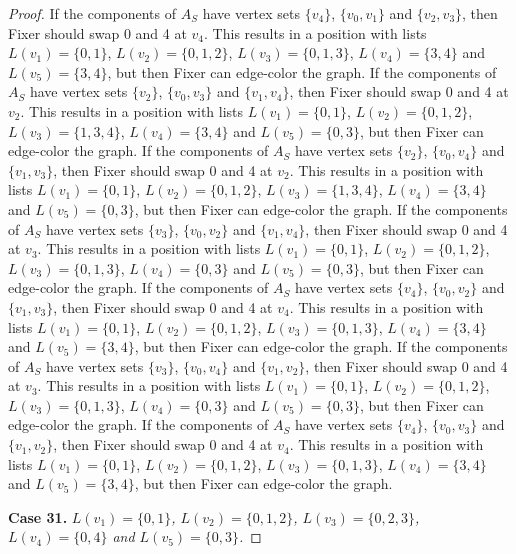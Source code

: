 \documentclass[12pt]{amsart}
\theoremstyle{plain}
\theoremstyle{definition}
\theoremstyle{remark}
\begin{document}
\begin{proof}
If the components of $A_S$ have vertex sets $\{v_4\}$, $\{v_0, v_1\}$ and $\{v_2, v_3\}$, then Fixer should swap 0 and 4 at $v_4$. This results in a position with lists $L(v_1) = \{0, 1\}$, $L(v_2) = \{0, 1, 2\}$, $L(v_3) = \{0, 1, 3\}$, $L(v_4) = \{3, 4\}$ and $L(v_5) = \{3, 4\}$, but then Fixer can edge-color the graph.
If the components of $A_S$ have vertex sets $\{v_2\}$, $\{v_0, v_3\}$ and $\{v_1, v_4\}$, then Fixer should swap 0 and 4 at $v_2$. This results in a position with lists $L(v_1) = \{0, 1\}$, $L(v_2) = \{0, 1, 2\}$, $L(v_3) = \{1, 3, 4\}$, $L(v_4) = \{3, 4\}$ and $L(v_5) = \{0, 3\}$, but then Fixer can edge-color the graph.
If the components of $A_S$ have vertex sets $\{v_2\}$, $\{v_0, v_4\}$ and $\{v_1, v_3\}$, then Fixer should swap 0 and 4 at $v_2$. This results in a position with lists $L(v_1) = \{0, 1\}$, $L(v_2) = \{0, 1, 2\}$, $L(v_3) = \{1, 3, 4\}$, $L(v_4) = \{3, 4\}$ and $L(v_5) = \{0, 3\}$, but then Fixer can edge-color the graph.
If the components of $A_S$ have vertex sets $\{v_3\}$, $\{v_0, v_2\}$ and $\{v_1, v_4\}$, then Fixer should swap 0 and 4 at $v_3$. This results in a position with lists $L(v_1) = \{0, 1\}$, $L(v_2) = \{0, 1, 2\}$, $L(v_3) = \{0, 1, 3\}$, $L(v_4) = \{0, 3\}$ and $L(v_5) = \{0, 3\}$, but then Fixer can edge-color the graph.
If the components of $A_S$ have vertex sets $\{v_4\}$, $\{v_0, v_2\}$ and $\{v_1, v_3\}$, then Fixer should swap 0 and 4 at $v_4$. This results in a position with lists $L(v_1) = \{0, 1\}$, $L(v_2) = \{0, 1, 2\}$, $L(v_3) = \{0, 1, 3\}$, $L(v_4) = \{3, 4\}$ and $L(v_5) = \{3, 4\}$, but then Fixer can edge-color the graph.
If the components of $A_S$ have vertex sets $\{v_3\}$, $\{v_0, v_4\}$ and $\{v_1, v_2\}$, then Fixer should swap 0 and 4 at $v_3$. This results in a position with lists $L(v_1) = \{0, 1\}$, $L(v_2) = \{0, 1, 2\}$, $L(v_3) = \{0, 1, 3\}$, $L(v_4) = \{0, 3\}$ and $L(v_5) = \{0, 3\}$, but then Fixer can edge-color the graph.
If the components of $A_S$ have vertex sets $\{v_4\}$, $\{v_0, v_3\}$ and $\{v_1, v_2\}$, then Fixer should swap 0 and 4 at $v_4$. This results in a position with lists $L(v_1) = \{0, 1\}$, $L(v_2) = \{0, 1, 2\}$, $L(v_3) = \{0, 1, 3\}$, $L(v_4) = \{3, 4\}$ and $L(v_5) = \{3, 4\}$, but then Fixer can edge-color the graph.

\noindent\textbf{Case 31.  }\textit{$L(v_1) = \{0, 1\}$, $L(v_2) = \{0, 1, 2\}$, $L(v_3) = \{0, 2, 3\}$, $L(v_4) = \{0, 4\}$ and $L(v_5) = \{0, 3\}$.}


\end{proof}
\end{document}
